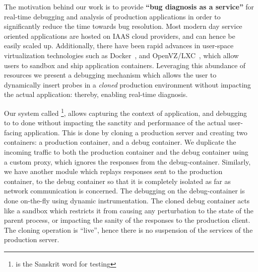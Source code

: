 \noindent
The motivation behind our work is to provide \textbf{``bug diagnosis as a service''} for real-time debugging and analysis of production applications in order to significantly reduce the time towards bug resolution.
Most modern day service oriented applications are hosted on IAAS cloud providers, and can hence be easily scaled  up. 
Additionally, there have been rapid advances in user-space virtualization technologies such as Docker~\cite{docker}, and OpenVZ/LXC~\cite{openvz,lxc}, which allow users to sandbox and ship application containers. 
Leveraging this abundance of resources we present a debugging mechanism which allows the user to dynamically insert probes in a \emph{cloned} production environment without impacting the actual application: thereby, enabling real-time diagnosis.

\noindent
Our system called \parikshan\footnote{\parikshan is the Sanskrit word for testing}, allows capturing the context of application, and debugging to to done without impacting the sanctity and performance of the actual user-facing application. 
This is done by cloning a production server and creating two containers: a production container, and a debug container. 
We duplicate the incoming traffic to both the production container and the debug container using a custom proxy, which ignores the responses from the debug-container.
Similarly, we have another module which replays responses sent to the production container, to the debug container so that it is completely isolated as far as network communication is concerned. 
The debugging on the debug-container is done on-the-fly using dynamic instrumentation. %
The cloned debug container acts like a sandbox which restricts it from causing any perturbation to the state of the parent process, or impacting the sanity of the responses to the production client. 
The cloning operation is ``live'', hence there is no suspension of the services of the production server.

